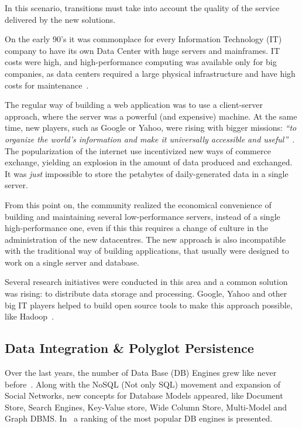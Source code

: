 \documentclass{article}
\begin{document}
In this scenario, transitions must take into account the quality of the service delivered by the new solutions.

On the early 90's it was commonplace for every Information Technology (IT) company to have its own Data Center with huge servers and mainframes. 
IT costs were high, and high-performance computing was available only for big companies, as data centers required a large physical infrastructure and have high costs for maintenance~\cite{Armbrust09m.:above}.

The regular way of building a web application was to use a client-server approach, where the server was a powerful (and expensive) machine. 
At the same time, new players, such as Google or Yahoo, were rising with bigger missions: \textit{``to organize the world's information and make it universally accessible and useful''}~\cite{Spector:2012:GHA:2209249.2209262}. 
The popularization of the internet use incentivized new ways of commerce exchange, yielding an explosion in the amount of data produced and exchanged. 
It was \textit{just} impossible to store the petabytes of daily-generated data in a single server. 

From this point on, the community realized the economical convenience of building and maintaining several low-performance servers, instead of a single high-performance one, even if this this requires a change of culture in the administration of the new datacentres.
The new approach is also incompatible with the traditional way of building applications, that usually were designed to work on a single server and database. 

Several research initiatives were conducted in this area and a common solution was rising: to distribute data storage and processing. 
Google, Yahoo and other big IT players helped to build open source tools to make this approach possible, like Hadoop~\cite{5496972}.


\subsection{Data Integration \& Polyglot Persistence}
Over the last years, the number of Data Base (DB) Engines grew like never before~\cite{dbranking}. 
Along with the NoSQL (Not only SQL) movement and expansion of Social Networks, new concepts for Database Models appeared, like Document Store, Search Engines, Key-Value store, Wide Column Store, Multi-Model and Graph DBMS. 
In~\cite{dbranking} a ranking of the most popular DB engines is presented.
\end{document}
